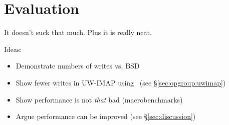\section {Evaluation}
\label{sec:evaluation}
\label{sec:evaluation:uwimap}

It doesn't suck that much. Plus it is really neat.

Ideas:
\begin{itemize}
\item Demonstrate numbers of writes vs. BSD
\item Show fewer writes in UW-IMAP using \opgroups\ (see \S\ref{sec:opgroup:uwimap})
\item Show performance is not \emph{that} bad (macrobenchmarks)
\item Argue performance can be improved (see \S\ref{sec:discussion})
\end{itemize}
